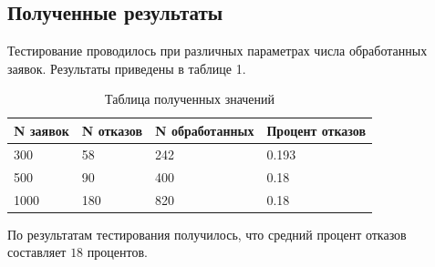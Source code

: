 \subsection*{Полученные результаты}
Тестирование проводилось при различных параметрах числа обработанных заявок. 
Результаты приведены в таблице 1.

\FloatBarrier
\begin{table}[h]
	\caption{Таблица полученных значений}
	\centering
	\begin{tabular}{ | l | l | l | l |}
		\hline
		N заявок & N отказов & N обработанных & Процент отказов \\ 
		\hline
		300 & 58 & 242 & 0.193  \\
		\hline
		500 & 90 & 400 & 0.18  \\
		\hline
		1000 & 180 & 820 & 0.18  \\
		\hline
	\end{tabular}
\end{table}

По результатам тестирования получилось, что средний процент отказов составляет $18$ процентов.